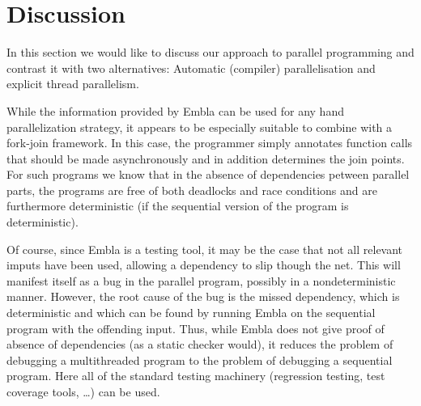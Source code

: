 %

\section{Discussion}

In this section we would like to discuss our approach to parallel
programming and contrast it with two alternatives: Automatic 
(compiler) parallelisation and explicit thread parallelism.

While the information provided by Embla can be used for any hand 
parallelization strategy, it appears to be especially suitable to
combine with a fork-join framework. In this case, the programmer 
simply annotates function calls that should be made asynchronously 
and in addition determines the join points. For such programs we
know that in the absence of dependencies petween parallel parts,
the programs are free of both deadlocks and race conditions and are 
furthermore deterministic (if the sequential version of the program 
is deterministic).

Of course, since Embla is a testing tool, it may be the case that not
all relevant imputs have been used, allowing a dependency to slip
though the net. This will manifest itself as a bug in the parallel
program, possibly in a nondeterministic manner. However, the root
cause of the bug is the missed dependency, which is deterministic and
which can be found by running Embla on the sequential program 
with the offending input. Thus,
while Embla does not give proof of absence of dependencies (as a
static checker would), it reduces the problem of debugging a
multithreaded program to the problem of debugging a sequential
program. Here all of the standard testing machinery (regression 
testing, test coverage tools, \ldots) can be used.

